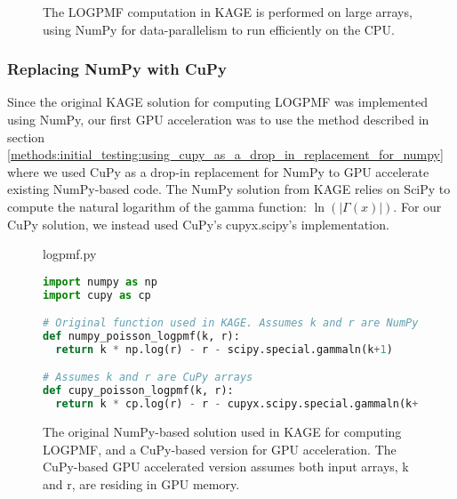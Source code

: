 \begin{figure}[H]
\begin{center}
{
}
\caption{
  The LOGPMF computation in KAGE is performed on large arrays, using NumPy for data-parallelism to run efficiently on the CPU.
}
\label{methods:gpu_accelerating_genotyping:figures:logpmf}
\end{center}
\end{figure}

\subsubsection{Replacing NumPy with CuPy}
Since the original KAGE solution for computing LOGPMF was implemented using NumPy, our first GPU acceleration was to use the method described in section \ref{methods:initial_testing:using_cupy_as_a_drop_in_replacement_for_numpy} where we used CuPy as a drop-in replacement for NumPy to GPU accelerate existing NumPy-based code.
The NumPy solution from KAGE relies on SciPy \cite{scipy} to compute the natural logarithm of the gamma function: $\ln(|\Gamma(x)|)$.
For our CuPy solution, we instead used CuPy's cupyx.scipy's implementation.

\begin{figure}[H] 
\begin{center}
logpmf.py
\end{center}
\begin{lstlisting}[language=Python,style=pycode]
import numpy as np
import cupy as cp

# Original function used in KAGE. Assumes k and r are NumPy arrays
def numpy_poisson_logpmf(k, r):
  return k * np.log(r) - r - scipy.special.gammaln(k+1) 

# Assumes k and r are CuPy arrays
def cupy_poisson_logpmf(k, r):
  return k * cp.log(r) - r - cupyx.scipy.special.gammaln(k+1) 
\end{lstlisting}
\caption{
  The original NumPy-based solution used in KAGE for computing LOGPMF, and a CuPy-based version for GPU acceleration.
  The CuPy-based GPU accelerated version assumes both input arrays, k and r, are residing in GPU memory.
}
\label{methods:gpu_accelerating_genotyping:figures:logpmf_array_implementations}
\end{figure}


